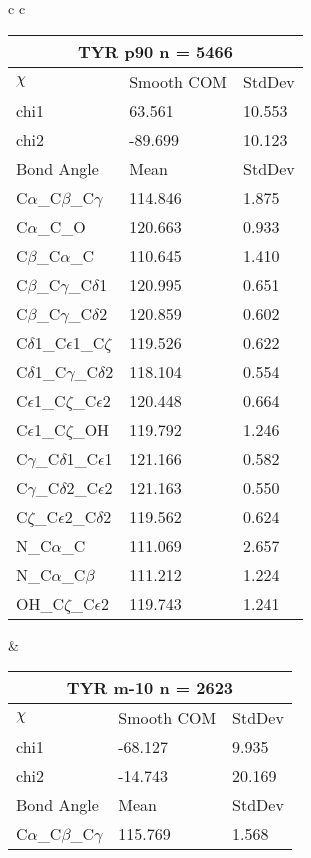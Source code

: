 \begin{longtable}{ c c }

  \begin{tabular}{ l l l }
  \toprule
  \multicolumn{3}{c}{TYR \textbf{p90} n = 5466} \\ \toprule
  $\chi$       & Smooth COM & StdDev \\ \midrule
  chi1 & 63.561 & 10.553 \\ 
  chi2 & -89.699 & 10.123 \\ \midrule
  Bond Angle   & Mean     & StdDev \\ \midrule
  C$\alpha$\_C$\beta$\_C$\gamma$ & 114.846 & 1.875\\
  C$\alpha$\_C\_O & 120.663 & 0.933\\
  C$\beta$\_C$\alpha$\_C & 110.645 & 1.410\\
  C$\beta$\_C$\gamma$\_C$\delta$1 & 120.995 & 0.651\\
  C$\beta$\_C$\gamma$\_C$\delta$2 & 120.859 & 0.602\\
  C$\delta$1\_C$\epsilon$1\_C$\zeta$ & 119.526 & 0.622\\
  C$\delta$1\_C$\gamma$\_C$\delta$2 & 118.104 & 0.554\\
  C$\epsilon$1\_C$\zeta$\_C$\epsilon$2 & 120.448 & 0.664\\
  C$\epsilon$1\_C$\zeta$\_OH & 119.792 & 1.246\\
  C$\gamma$\_C$\delta$1\_C$\epsilon$1 & 121.166 & 0.582\\
  C$\gamma$\_C$\delta$2\_C$\epsilon$2 & 121.163 & 0.550\\
  C$\zeta$\_C$\epsilon$2\_C$\delta$2 & 119.562 & 0.624\\
  N\_C$\alpha$\_C & 111.069 & 2.657\\
  N\_C$\alpha$\_C$\beta$ & 111.212 & 1.224\\
  OH\_C$\zeta$\_C$\epsilon$2 & 119.743 & 1.241\\
  \bottomrule
  \end{tabular}
  &
  \begin{tabular}{ l l l }
  \toprule
  \multicolumn{3}{c}{TYR \textbf{m-10} n = 2623} \\ \toprule
  $\chi$       & Smooth COM & StdDev \\ \midrule
  chi1 & -68.127 & 9.935 \\ 
  chi2 & -14.743 & 20.169 \\ \midrule
  Bond Angle   & Mean     & StdDev \\ \midrule
  C$\alpha$\_C$\beta$\_C$\gamma$ & 115.769 & 1.568\\

\end{tabular}
\end{longtable}
